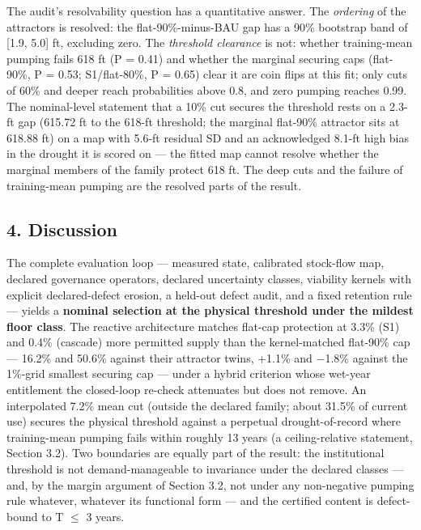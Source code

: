 The audit's resolvability question has a quantitative answer. The
\emph{ordering} of the attractors is resolved: the flat-90\%-minus-BAU
gap has a 90\% bootstrap band of {[}1.9, 5.0{]} ft, excluding zero. The
\emph{threshold clearance} is not: whether training-mean pumping fails
618 ft (P = 0.41) and whether the marginal securing caps (flat-90\%, P =
0.53; S1/flat-80\%, P = 0.65) clear it are coin flips at this fit; only
cuts of 60\% and deeper reach probabilities above 0.8, and zero pumping
reaches 0.99. The nominal-level statement that a 10\% cut secures the
threshold rests on a 2.3-ft gap (615.72 ft to the 618-ft threshold; the
marginal flat-90\% attractor sits at 618.88 ft) on a map with 5.6-ft
residual SD and an acknowledged 8.1-ft high bias in the drought it is
scored on --- the fitted map cannot resolve whether the marginal members
of the family protect 618 ft. The deep cuts and the failure of
training-mean pumping are the resolved parts of the result.

\subsection{4. Discussion}\label{edw-discussion}

The complete evaluation loop --- measured state, calibrated stock-flow
map, declared governance operators, declared uncertainty classes,
viability kernels with explicit declared-defect erosion, a held-out
defect audit, and a fixed retention rule --- yields a \textbf{nominal
selection at the physical threshold under the mildest floor class}. The
reactive architecture matches flat-cap protection at 3.3\% (S1) and
0.4\% (cascade) more permitted supply than the kernel-matched flat-90\%
cap --- 16.2\% and 50.6\% against their attractor twins, +1.1\% and
\ensuremath{-}1.8\% against the 1\%-grid smallest securing cap --- under a hybrid
criterion whose wet-year entitlement the closed-loop re-check attenuates
but does not remove. An interpolated 7.2\% mean cut (outside the
declared family; about 31.5\% of current use) secures the physical
threshold against a perpetual drought-of-record where training-mean
pumping fails within roughly 13 years (a ceiling-relative statement,
Section 3.2). Two boundaries are equally part of the result: the
institutional threshold is not demand-manageable to invariance under the
declared classes --- and, by the margin argument of Section 3.2, not
under any non-negative pumping rule whatever, whatever its functional
form --- and the certified content is defect-bound to T \ensuremath{\leq} 3
years.

